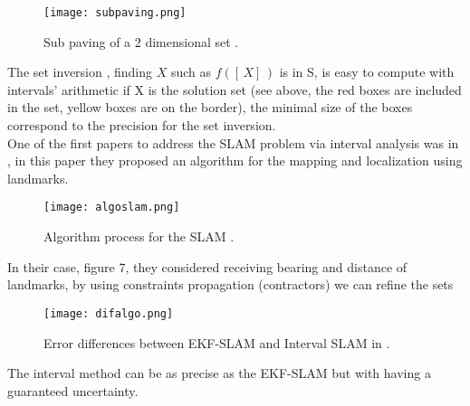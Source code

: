 \begin{figure}[H]
\centering
    \texttt{[image: subpaving.png]} 
    \caption{Sub paving of a 2 dimensional set \cite{Bet14}.}
    \label{fig:subExample}
\end{figure}


The set inversion \cite{jaulin1993set}, finding $X$ such as $f([\,X]\,)$ is in S, is easy to compute with intervals' arithmetic if X is the solution set (see above, the red boxes are included in the set, yellow boxes are on the border), the minimal size of the boxes correspond to the precision for the set inversion.\\ 
One of the first papers to address the SLAM problem via interval analysis was in \cite{di2004set}, in this paper they proposed an algorithm for the mapping and localization using landmarks.

\begin{figure}[H]
\centering
    \texttt{[image: algoslam.png]} 
    \caption{Algorithm process for the SLAM \cite{di2004set}.}
    \label{fig:algoslamExample}
\end{figure}

In their case, figure 7, they considered receiving bearing and distance of landmarks, by using constraints propagation (contractors) we can refine the sets \cite{jaulin2010resolution}

\begin{figure}[H]
\centering
    \texttt{[image: difalgo.png]} 
    \caption{Error differences between EKF-SLAM and Interval SLAM in \cite{di2004set}.}
    \label{fig:difalgo}
\end{figure}

The interval method can be as precise as the EKF-SLAM but with having a guaranteed uncertainty.